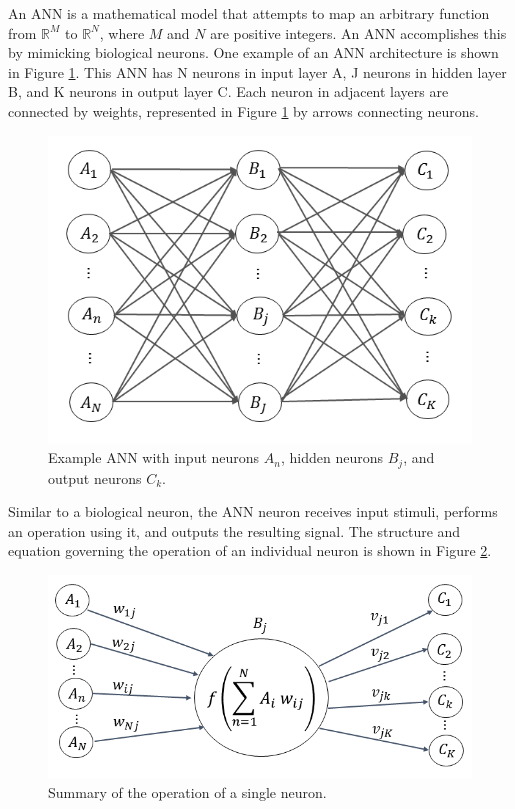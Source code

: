 An ANN is a mathematical model that attempts to map an arbitrary function from $\mathbb{R}^M$ to $\mathbb{R}^N$, where $M$ and $N$ are positive integers. An ANN accomplishes this by mimicking biological neurons. One example of an ANN architecture is shown in Figure \ref{fig:Network}. This ANN has N neurons in input layer A, J neurons in hidden layer B, and K neurons in output layer C. Each neuron in adjacent layers are connected by weights, represented in Figure \ref{fig:Network} by arrows connecting neurons. 


\begin{figure}[H]
\centering
\includegraphics[width=0.75\linewidth]{images/Network}
\caption{Example ANN with input neurons $A_n$, hidden neurons $B_j$, and output neurons $C_k$.}
\label{fig:Network}
\end{figure}


Similar to a biological neuron, the ANN neuron receives input stimuli, performs an operation using it, and outputs the resulting signal. The structure and equation governing the operation of an individual neuron is shown in Figure \ref{fig:Node}. 

\begin{figure}[H]
	\centering
	\includegraphics[width=0.75\linewidth]{images/Node_ABC_2}
	\caption{Summary of the operation of a single neuron.}
	\label{fig:Node}
\end{figure}

